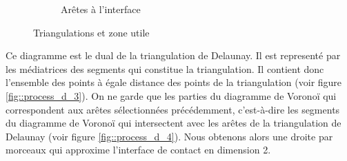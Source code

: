 \begin{figure}[ht]
\begin{subfigure}{0.45\textwidth}
  \caption{Arêtes à l'interface}
  \label{fig::process_d_2}
\end{subfigure}
\caption{Triangulations et zone utile}
\label{fig::delaunays_process_1}
\end{figure}


Ce diagramme est le dual de la triangulation de Delaunay. Il est representé par les
médiatrices des segments qui constitue la triangulation.
 Il contient donc l'ensemble des points à
égale distance des points de la triangulation (voir figure \ref{fig::process_d_3}).
On ne garde que les parties du diagramme de Voronoï qui correspondent aux arêtes sélectionnées
précédemment, c'est-à-dire les segments du diagramme de Voronoï qui intersectent
avec les arêtes de la triangulation de Delaunay (voir figure \ref{fig::process_d_4}).
Nous obtenons alors une droite par morceaux
qui approxime l'interface de contact en dimension 2.

